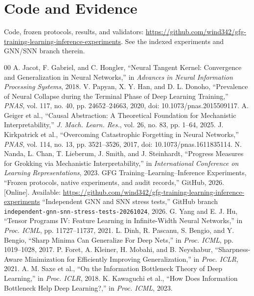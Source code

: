 \documentclass[conference,10pt]{IEEEtran}
\begin{document}
\section*{Code and Evidence}
Code, frozen protocols, results, and validators: \url{https://github.com/wind342/gfg-training-learning-inference-experiments}. See the indexed experiments and GNN/SNN branch therein. 

\balance
\begingroup\footnotesize
\begin{thebibliography}{00}
 A. Jacot, F. Gabriel, and C. Hongler, ``Neural Tangent Kernel: Convergence and Generalization in Neural Networks,'' in \emph{Advances in Neural Information Processing Systems}, 2018.
 V. Papyan, X. Y. Han, and D. L. Donoho, ``Prevalence of Neural Collapse during the Terminal Phase of Deep Learning Training,'' \emph{PNAS}, vol. 117, no. 40, pp. 24652--24663, 2020, doi: 10.1073/pnas.2015509117.
 A. Geiger et al., ``Causal Abstraction: A Theoretical Foundation for Mechanistic Interpretability,'' \emph{J. Mach. Learn. Res.}, vol. 26, no. 83, pp. 1--64, 2025.
 J. Kirkpatrick et al., ``Overcoming Catastrophic Forgetting in Neural Networks,'' \emph{PNAS}, vol. 114, no. 13, pp. 3521--3526, 2017, doi: 10.1073/pnas.1611835114.
 N. Nanda, L. Chan, T. Lieberum, J. Smith, and J. Steinhardt, ``Progress Measures for Grokking via Mechanistic Interpretability,'' in \emph{International Conference on Learning Representations}, 2023.
 GFG Training--Learning--Inference Experiments, ``Frozen protocols, native experiments, and audit records,'' GitHub, 2026. [Online]. Available: \url{https://github.com/wind342/gfg-training-learning-inference-experiments}
 ``Independent GNN and SNN stress tests,'' GitHub branch \texttt{independent-gnn-snn-stress-tests-20261024}, 2026.
 G. Yang and E. J. Hu, ``Tensor Programs IV: Feature Learning in Infinite-Width Neural Networks,'' in \emph{Proc. ICML}, pp. 11727--11737, 2021.
 L. Dinh, R. Pascanu, S. Bengio, and Y. Bengio, ``Sharp Minima Can Generalize For Deep Nets,'' in \emph{Proc. ICML}, pp. 1019--1028, 2017.
 P. Foret, A. Kleiner, H. Mobahi, and B. Neyshabur, ``Sharpness-Aware Minimization for Efficiently Improving Generalization,'' in \emph{Proc. ICLR}, 2021.
 A. M. Saxe et al., ``On the Information Bottleneck Theory of Deep Learning,'' in \emph{Proc. ICLR}, 2018.
 K. Kawaguchi et al., ``How Does Information Bottleneck Help Deep Learning?,'' in \emph{Proc. ICML}, 2023.

\end{thebibliography}
\end{document}
